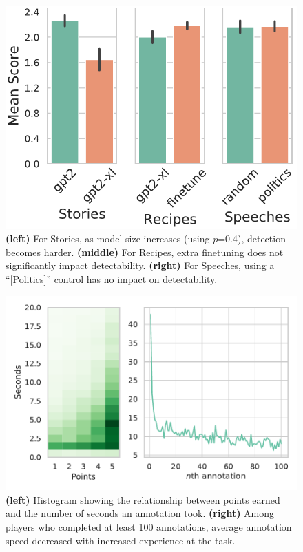 \begin{figure}[tb]
    \centering
    \includegraphics[width=0.7\linewidth]{figures/model_size_and_finetuning.pdf}
    \caption{\textbf{(left)} For Stories, as model size increases (using $p$=0.4), detection becomes harder. \textbf{(middle)} For Recipes, extra finetuning does not significantly impact detectability. \textbf{(right)} For Speeches, using a ``[Politics]'' control has no impact on detectability.}
    \label{fig:model_size_finetuning}
\end{figure}

\begin{figure}[tb]
    \centering
    \includegraphics[width=\linewidth]{figures/time_tracking.pdf}
    \caption{\textbf{(left)} Histogram showing the relationship between points earned and the number of seconds an annotation took. \textbf{(right)} Among players who completed at least 100 annotations, average annotation speed decreased with increased experience at the task.
    }
    \label{fig:time_tracking}
\end{figure}


